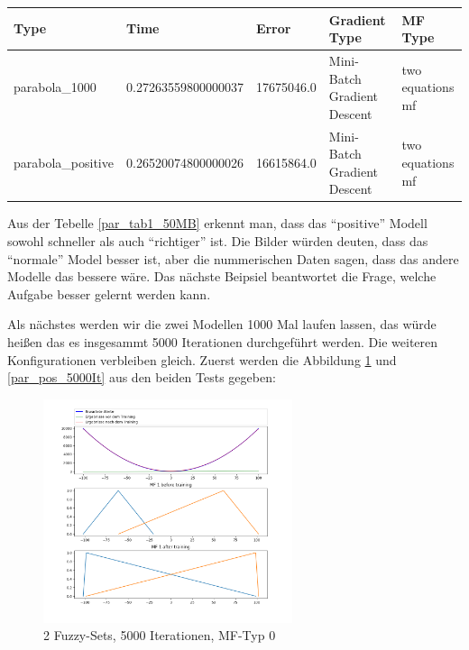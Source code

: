 {\begin{center}
	\begin{minipage}{\textwidth}
	\begin{tabular}{ | p{3.1cm} | l | l | p{3cm} | p{3cm} |}
		\hline
		Type & Time & Error & Gradient Type & MF Type \\ \hline
		parabola\_1000 & 0.27263559800000037 & 17675046.0 & Mini-Batch Gradient Descent & two equations mf
		 \\ \hline
		parabola\_positive & 0.26520074800000026 & 16615864.0 & Mini-Batch Gradient Descent & two equations mf
		 \\ \hline
	\end{tabular}
\label{par_tab1_50MB}
\end{minipage}
\end{center} 

Aus der Tebelle \ref{par_tab1_50MB} erkennt man, dass das ``positive'' Modell sowohl schneller als auch ``richtiger'' ist. Die Bilder würden deuten, dass das ``normale'' Model besser ist, aber die nummerischen Daten sagen, dass das andere Modelle das bessere wäre. Das nächste Beipsiel beantwortet die Frage, welche Aufgabe besser gelernt werden kann.

Als nächstes werden wir die zwei Modellen 1000 Mal laufen lassen, das würde heißen das es insgesammt 5000 Iterationen durchgeführt werden. Die weiteren Konfigurationen verbleiben gleich. Zuerst werden die Abbildung \ref{par_5000It} und \ref{par_pos_5000It} aus den beiden Tests gegeben:

\begin{figure}[htbp]
	\begin{minipage}{\textwidth}
	
	\centering
	\includegraphics[width=0.65\textwidth]{images/parabola_1000/Mini-Batch/parabola_1000 1 Input 2 Sets 5000 Epochs Mini-Batch Gradient Descent two equations mf.png}
	\caption{2 Fuzzy-Sets, 5000 Iterationen, MF-Typ 0}
	\label{par_5000It}
\end{minipage}
\end{figure}
\begin{figure}[htbp]
	\begin{minipage}{\textwidth}
	

\end{minipage}
\end{figure}}
